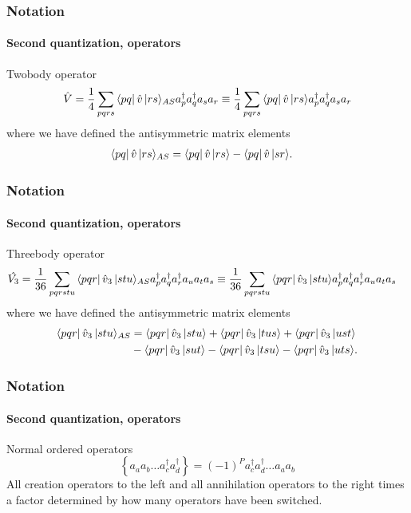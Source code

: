 \begin{frame}[fragile]
    \frametitle{Notation}
    \framesubtitle{Second quantization, operators}
        \small
    \begin{block}{Twobody operator}
        \begin{align*}
            \hat{V} &= \frac{1}{4} \sum_{pqrs} \bra{pq}\hat{v}\,|{rs}\rangle_{AS} a_p^\dagger a_q^\dagger a_s a_r
            \equiv \frac{1}{4} \sum_{pqrs} \bra{pq}\hat{v}\,|{rs}\rangle a_p^\dagger a_q^\dagger a_s a_r \\
        \end{align*}
        where we have defined the antisymmetric matrix elements
        \begin{align*}
            \bra{pq}\hat{v}\,|{rs}\rangle_{AS} &= \bra{pq}\hat{v}\,|{rs}\rangle - \bra{pq}\hat{v}\,|{sr}\rangle.
        \end{align*}
    \end{block}
            
\end{frame}
\begin{frame}[fragile]
    \frametitle{Notation}
    \framesubtitle{Second quantization, operators}
        \small
    \begin{block}{Threebody operator}
        \footnotesize
        \begin{align*}
            \hat{V_3} &= \frac{1}{36} \sum_{pqrstu} \bra{pqr}\hat{v}_3\,|{stu}\rangle_{AS} 
                a_p^\dagger a_q^\dagger a_r^\dagger a_u a_t a_s
            \equiv \frac{1}{36} \sum_{pqrstu} \bra{pqr}\hat{v}_3\,|{stu}\rangle
                a_p^\dagger a_q^\dagger a_r^\dagger a_u a_t a_s
        \end{align*}
        \normalsize
        where we have defined the antisymmetric matrix elements
        \begin{align*}
            \bra{pqr}\hat{v}_3\,|{stu}\rangle_{AS} &= \bra{pqr}\hat{v}_3\,|{stu}\rangle + \bra{pqr}\hat{v}_3\,|{tus}\rangle + \bra{pqr}\hat{v}_3\,|{ust}\rangle \\
            & - \bra{pqr}\hat{v}_3\,|{sut}\rangle - \bra{pqr}\hat{v}_3\,|{tsu}\rangle - \bra{pqr}\hat{v}_3\,|{uts}\rangle.
        \end{align*}
    \end{block}
        
            
\end{frame}
        
\begin{frame}[fragile]
    \frametitle{Notation}
    \framesubtitle{Second quantization, operators}
    \normalsize
    \begin{block}{Normal ordered operators}
        \begin{equation*}
            \left\{a_a a_b \ldots a_c^\dagger a_d^\dagger\right\} = 
                (-1)^P a_c^\dagger a_d^\dagger \ldots a_a a_b
        \end{equation*}
    All creation operators to the left and all annihilation operators to the right times a factor determined by how many operators have been switched.
    \end{block}
        
            
\end{frame}

